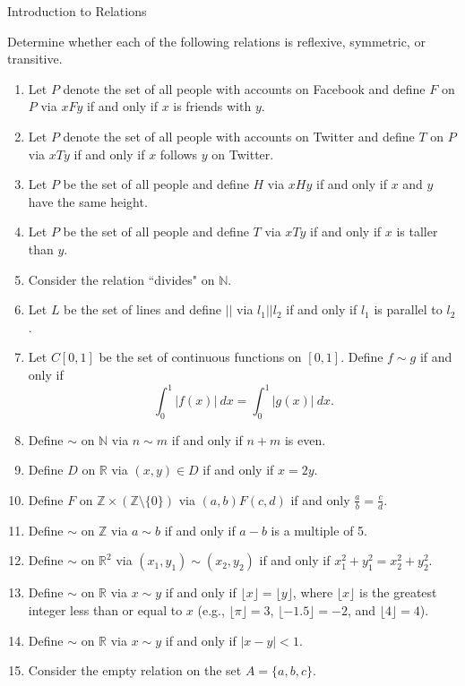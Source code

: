 \begin{section}{Introduction to Relations}
\begin{problem}\label{prob:lots of relations}
Determine whether each of the following relations is reflexive, symmetric, or transitive.
\begin{enumerate}[label=\textrm{(\alph*)}]
\item\label{prob:facebook} Let $P$ denote the set of all people with accounts on Facebook and define $F$ on $P$ via $xFy$ if and only if $x$ is friends with $y$. 
\item\label{prob:twitter} Let $P$ denote the set of all people with accounts on Twitter and define $T$ on $P$ via $xTy$ if and only if $x$ follows $y$ on Twitter. 
\item Let $P$ be the set of all people and define $H$ via $xHy$ if and only if $x$ and $y$ have the same height.
\item Let $P$ be the set of all people and define $T$ via $xTy$ if and only if $x$ is taller than $y$.
\item Consider the relation ``divides" on $\mathbb{N}$.
\item Let $L$ be the set of lines and define $||$ via $l_1||l_2$ if and only if $l_1$ is parallel to $l_2$.
\item Let $C[0,1]$ be the set of continuous functions on $[0,1]$.  Define $f\sim g$ if and only if
\[
\int_0^1|f(x)|\ dx=\int_0^1|g(x)|\ dx.
\]
\item Define $\sim$ on $\mathbb{N}$ via $n\sim m$ if and only if $n+m$ is even.
\item Define $D$ on $\mathbb{R}$ via $(x,y)\in D$ if and only if $x=2y$.
\item Define $F$ on $\mathbb{Z}\times \left(\mathbb{Z}\setminus \{0\}\right)$ via $(a,b)F(c,d)$ if and only $\frac{a}{b}=\frac{c}{d}$.
\item\label{prob:mod 5} Define $\sim$ on $\mathbb{Z}$ via $a\sim b$ if and only if $a-b$ is a multiple of 5.
\item Define $\sim$ on $\mathbb{R}^2$ via $(x_1,y_1)\sim (x_2,y_2)$ if and only if $x_1^2+y_1^2=x_2^2+y_2^2$.
\item Define $\sim$ on $\mathbb{R}$ via $x\sim y$ if and only if $\lfloor x\rfloor =\lfloor y\rfloor$, where $\lfloor x\rfloor$ is the greatest integer less than or equal to $x$ (e.g., $\lfloor \pi\rfloor=3$, $\lfloor -1.5\rfloor=-2$, and $\lfloor 4\rfloor=4$).
\item Define $\sim$ on $\mathbb{R}$ via $x \sim y$ if and only if $|x-y|<1$.
\item Consider the empty relation on the set $A=\{a,b,c\}$.
\end{enumerate}
\end{problem}


\end{section}

